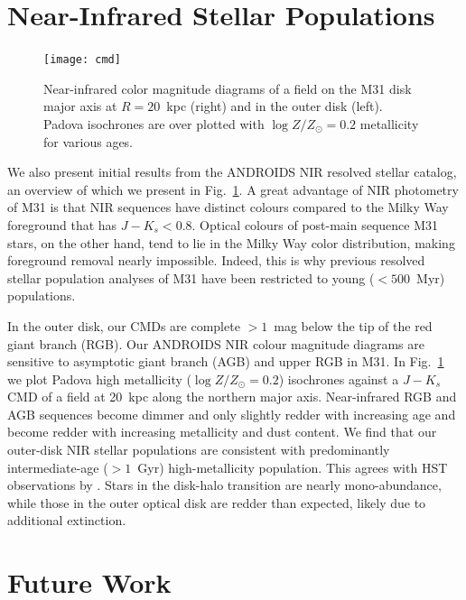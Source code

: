 \documentclass[11pt,twoside]{article}
\begin{document}
\section{Near-Infrared Stellar Populations}

\begin{figure}[t]
\centering
\texttt{[image: cmd]}
\caption{Near-infrared color magnitude diagrams of a field on the M31 disk major axis at $R=20$~kpc (right) and in the outer disk (left). Padova isochrones are over plotted with $\log Z/Z_\odot=0.2$ metallicity for various ages.}
\label{fig:cmd}
\end{figure}

We also present initial results from the ANDROIDS NIR resolved stellar catalog, an overview of which we present in Fig.~\ref{fig:cmd}.
A great advantage of NIR photometry of M31 is that NIR sequences have distinct colours compared to the Milky Way foreground that has $J-K_s < 0.8$.
Optical colours of post-main sequence M31 stars, on the other hand, tend to lie in the Milky Way color distribution, making foreground removal nearly impossible.
Indeed, this is why previous resolved stellar population analyses of M31 \citep[e.g.,][]{Williams:2003,Davidge:2012} have been restricted to young ($<500$~Myr) populations.

In the outer disk, our CMDs are complete $>1$~mag below the tip of the red giant branch (RGB).
Our ANDROIDS NIR colour magnitude diagrams are sensitive to asymptotic giant branch (AGB) and upper RGB in M31.
In Fig.~\ref{fig:cmd} we plot Padova high metallicity ($\log Z/Z_\odot = 0.2$) isochrones \citep{Marigo:2008} against a $J-K_s$ CMD of a field at 20~kpc along the northern major axis.
Near-infrared RGB and AGB sequences become dimmer and only slightly redder with increasing age and become redder with increasing metallicity and dust content.
We find that our outer-disk NIR stellar populations are consistent with predominantly intermediate-age ($>1$~Gyr) high-metallicity population.
This agrees with HST observations by \cite{Brown:2006}.
Stars in the disk-halo transition are nearly mono-abundance, while those in the outer optical disk are redder than expected, likely due to additional extinction.

\section{Future Work}
\end{document}
